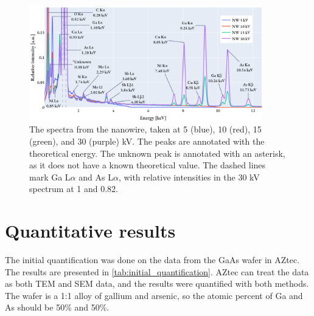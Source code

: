 \begin{figure}[ht!]
    \centering
    \includegraphics[width=0.90\textwidth]{figures/each_spectra/NW_everything.png}
    \caption{
        The spectra from the nanowire, taken at 5 (blue), 10 (red), 15 (green), and 30 (purple) kV.
        The peaks are annotated with the theoretical energy.
        The unknown peak is annotated with an asterisk, as it does not have a known theoretical value.
        The dashed lines mark Ga L$\alpha$ and As L$\alpha$, with relative intensities in the 30 kV spectrum at 1 and 0.82.
    }
    \label{fig:results:Spectra_NW}
\end{figure}



\newpage






















\section{Quantitative results}
\label{sec:results:quantification}


The initial quantification was done on the data from the GaAs wafer in AZtec.
The results are presented in \cref{tab:initial_quantification}.
AZtec can treat the data as both TEM and SEM data, and the results were quantified with both methods.
The wafer is a 1:1 alloy of gallium and arsenic, so the atomic percent of Ga and As should be 50\% and 50\%.


